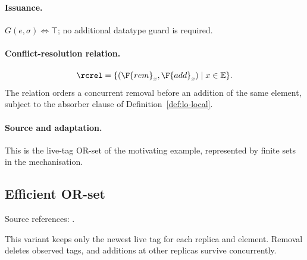 \paragraph{Issuance.}
$G(e,\sigma)\iff\top$; no additional datatype guard is required.

\paragraph{Conflict-resolution relation.}
\[
\rcrel=\{(\F{rem}_x,\F{add}_x)\mid x\in\mathbb E\}.
\]
The relation orders a concurrent removal before an addition of the same
element, subject to the absorber clause of Definition~\ref{def:lo-local}.

\paragraph{Source and adaptation.}
This is the live-tag OR-set of the motivating example, represented by finite sets in the mechanisation.


\subsection{Efficient OR-set}
\label{app:dt-efficient-or-set}

\noindent Source references: \cite{neem}.

This variant keeps only the newest live tag for each replica and element. Removal deletes observed tags, and additions at other replicas survive concurrently.

